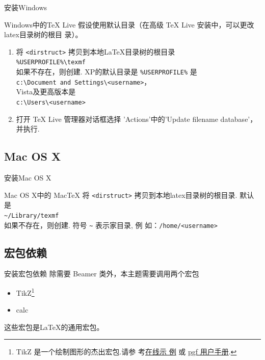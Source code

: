 \documentclass[xcolor=svgnames, t, aspectratio=169]{ctexbeamer}
\begin{document}
\begin{frame}{安装}{Windows}
  \begin{block}{Windows中的TeX Live}
    假设使用默认目录（在高级 TeX Live 安装中，可以更改latex目录树的根目
    录）。
    \begin{enumerate}
    \item 将 {\tt <dirstruct>} 拷贝到本地{\LaTeX}目录树的根目录\\
      {\tt \%USERPROFILE\%\textbackslash texmf}\\
      如果不存在，则创建. XP的默认目录是 {\tt \%USERPROFILE\%} 是\\
      {\tt c:\textbackslash Document and
        Settings\textbackslash<username>}，\\
      Vista及更高版本是\\
      {\tt c:\textbackslash Users\textbackslash<username>}
    \item 打开 TeX Live 管理器对话框选择 'Actions'中的'Update filename
      database'，并执行.
    \end{enumerate}
  \end{block}
\end{frame}

\subsection{Mac OS X}
\begin{frame}{安装}{Mac OS X}
  \begin{block}{Mac OS X中的 MacTeX}
    将 {\tt <dirstruct>} 拷贝到本地latex目录树的根目录. 默认是\\
    {\tt \textasciitilde /Library/texmf}\\
    如果不存在，则创建. 符号 {\tt \textasciitilde} 表示家目录, 例
    如：{\tt /home/<username>}
  \end{block}
\end{frame}

\subsection{宏包依赖}
\begin{frame}{安装}{宏包依赖}
  除需要 Beamer 类外，本主题需要调用两个宏包
  \begin{itemize}
  \item TikZ\footnote{TikZ 是一个绘制图形的杰出宏包.请参
      考\href{http://www.texample.net/tikz/examples/}{在线示
        例} 或
      \href{http://tug.ctan.org/tex-archive/graphics/pgf/base/doc/generic/pgf/pgfmanual.pdf}{pgf
        用户手册}. }
  \item calc
  \end{itemize}
  这些宏包是{\LaTeX}的通用宏包。
\end{frame}
\end{document}
